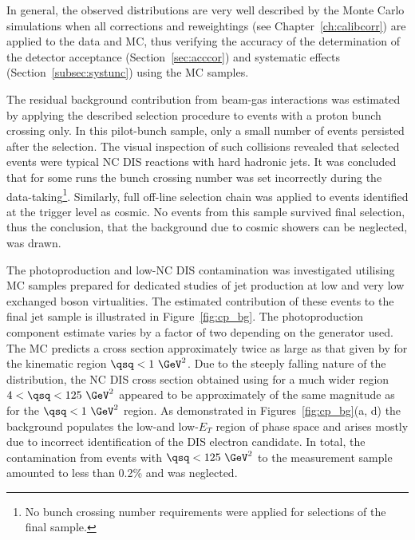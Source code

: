 In general, the observed distributions are very well described by the Monte Carlo simulations when all corrections and reweightings (see Chapter~\ref{ch:calibcorr}) are applied to the data and MC, thus verifying the accuracy of the determination of the detector acceptance (Section~\ref{sec:acccor}) and systematic effects (Section~\ref{subsec:systunc}) using the MC samples.

The residual background contribution from beam-gas interactions was estimated by applying the described selection procedure to events with a proton bunch crossing only. In this pilot-bunch sample, only a small number of events persisted after the selection. The visual inspection of such collisions revealed that selected events were typical NC DIS reactions with hard hadronic jets. It was concluded that for some runs the bunch crossing number was set incorrectly during the data-taking\footnote{No bunch crossing number requirements were applied for selections of the final sample.}. Similarly, full off-line selection chain was applied to events identified at the trigger level as cosmic. No events from this sample survived final selection, thus the conclusion, that the background due to cosmic showers can be neglected, was drawn.

The photoproduction and low-\qsq NC DIS contamination was investigated utilising MC samples prepared for dedicated studies of jet production at low and very low exchanged boson virtualities. The estimated contribution of these events to the final jet sample is illustrated in Figure~\ref{fig:cp_bg}. The photoproduction component estimate varies by a factor of two depending on the generator used. The \pythia MC predicts a cross section approximately twice as large as that given by \herwig for the kinematic region $\qsq < 1~\GeV^2$. Due to the steeply falling nature of the \qsq distribution, the NC DIS cross section obtained using \lepto for a much wider region $4< \qsq < 125~\GeV^2$ appeared to be approximately of the same magnitude as for the $\qsq < 1~\GeV^2$ region. As demonstrated in Figures~\ref{fig:cp_bg}(a, d) the background populates the low-\qsq and low-$E_T$ region of phase space and arises mostly due to incorrect identification of the DIS electron candidate. In total, the contamination from events with $\qsq < 125~\GeV^2$ to the measurement sample amounted to less than 0.2\% and was neglected.


